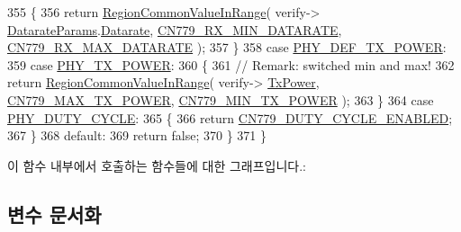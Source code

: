 \begin{DoxyCode}
355         \{
356             \textcolor{keywordflow}{return} \mbox{\hyperlink{group___r_e_g_i_o_n_c_o_m_m_o_n_gafdd1c80d953e18d755a631b72a9c3bd3}{RegionCommonValueInRange}}( verify->
      \mbox{\hyperlink{unionu_verify_params_a92427be16343eb3d9c14334eb95ec058}{DatarateParams}}.\mbox{\hyperlink{structu_verify_params_1_1s_datarate_params_ae2f6080f3aa0e9485c55513ca56bb24d}{Datarate}}, \mbox{\hyperlink{group___r_e_g_i_o_n_c_n779_ga9b8a3086475f37d72484e75a4bf8f4a5}{CN779\_RX\_MIN\_DATARATE}}, 
      \mbox{\hyperlink{group___r_e_g_i_o_n_c_n779_ga89261ba0eddf04555c7a38fff0dff2d6}{CN779\_RX\_MAX\_DATARATE}} );
357         \}
358         \textcolor{keywordflow}{case} \mbox{\hyperlink{group___r_e_g_i_o_n_gga51cbe8f5433d914fe9cf81b451de2c2da18ae0d314f20c212f9e40207099ab1bb}{PHY\_DEF\_TX\_POWER}}:
359         \textcolor{keywordflow}{case} \mbox{\hyperlink{group___r_e_g_i_o_n_gga51cbe8f5433d914fe9cf81b451de2c2da0dceb30b79f1bae301afd5406a86d6f3}{PHY\_TX\_POWER}}:
360         \{
361             \textcolor{comment}{// Remark: switched min and max!}
362             \textcolor{keywordflow}{return} \mbox{\hyperlink{group___r_e_g_i_o_n_c_o_m_m_o_n_gafdd1c80d953e18d755a631b72a9c3bd3}{RegionCommonValueInRange}}( verify->
      \mbox{\hyperlink{unionu_verify_params_a037b4f849fa8ed4aa1d3c58aef2b28ec}{TxPower}}, \mbox{\hyperlink{group___r_e_g_i_o_n_c_n779_ga8a70356561f3416db21a1e93b4ee4ae9}{CN779\_MAX\_TX\_POWER}}, \mbox{\hyperlink{group___r_e_g_i_o_n_c_n779_gab0e266968cb85199e9002eb1d3c5a719}{CN779\_MIN\_TX\_POWER}} );
363         \}
364         \textcolor{keywordflow}{case} \mbox{\hyperlink{group___r_e_g_i_o_n_gga51cbe8f5433d914fe9cf81b451de2c2dac66308571e624ecc28c79ee0deab8cf0}{PHY\_DUTY\_CYCLE}}:
365         \{
366             \textcolor{keywordflow}{return} \mbox{\hyperlink{group___r_e_g_i_o_n_c_n779_ga87494ed194c1c38e301dbb4990f7f005}{CN779\_DUTY\_CYCLE\_ENABLED}};
367         \}
368         \textcolor{keywordflow}{default}:
369             \textcolor{keywordflow}{return} \textcolor{keyword}{false};
370     \}
371 \}
\end{DoxyCode}
이 함수 내부에서 호출하는 함수들에 대한 그래프입니다.\+:


\subsection{변수 문서화}
\mbox{\label{group___r_e_g_i_o_n_c_n779_gab4eef3dc42cf12e2e9fcb552cc5b137b}} 
